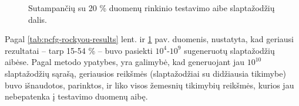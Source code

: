 \documentclass{VUMIFInfBakalaurinis}
\begin{document}
\begin{figure}[!ht]
  \begin{center}
  \end{center}
  \caption{
    Sutampančių su 20 \%  duomenų rinkinio testavimo aibe 
    slaptažodžių dalis.
  }
  \label{plot:pcfg-rockyou-results}
\end{figure}
Pagal \ref{tab:pcfg-rockyou-results} lent. ir \ref{plot:pcfg-rockyou-results} 
pav. duomenis, nustatyta, kad geriausi rezultatai -- tarp 15-54 \% -- buvo 
pasiekti $10^4$-$10^9$ sugeneruotų slaptažodžių aibėse. Pagal  
metodo ypatybes, yra galimybė, kad generuojant jau $10^{10}$ slaptažodžių 
sąrašą, geriausios reikšmės (slaptažodžiai su didžiausia tikimybe) buvo 
išnaudotos, parinktos, ir liko visos žemesnių tikimybių reikšmės, kurios jau 
nebepatenka į testavimo duomenų aibę.
\end{document}
